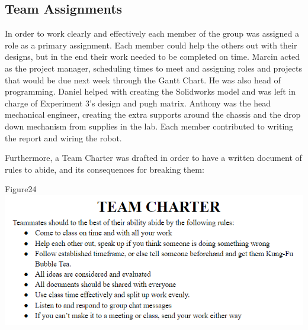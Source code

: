 \documentclass{article}
\begin{document}
\subsection{Team Assignments}
    In order to work clearly and effectively each member of the group was assigned a role as a primary assignment. Each member could help the others out with their designs, but in the end their work needed to be completed on time. Marcin acted as the project manager, scheduling times to meet and assigning roles and projects that would be due next week through the Gantt Chart. He was also head of programming. Daniel helped with creating the Solidworks model and was left in charge of Experiment 3's design and pugh matrix. Anthony was the head mechanical engineer, creating the extra supports around the chassis and the drop down mechanism from supplies in the lab. Each member contributed to writing the report and wiring the robot.

    Furthermore, a Team Charter was drafted in order to have a written document of rules to abide, and its consequences for breaking them: 
    \begin{center}{Figure24 \includegraphics[width=\textwidth]{TeamCharter.png}}\end{center}

\newpage
\end{document}
